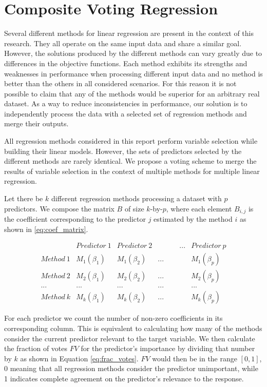 \chapter{Composite Voting Regression} \label{sec:comp_reg}
Several different methods for linear regression are present in the context of this research. They all operate on the same input data and share a similar goal. However, the solutions produced by the different methods can vary greatly due to differences in the objective functions. Each method exhibits its strengths and weaknesses in performance when processing different input data and no method is better than the others in all considered scenarios. For this reason it is not possible to claim that any of the methods would be superior for an arbitrary real dataset. As a way to reduce inconsistencies in performance, our solution is to independently process the data with a selected set of regression methods and merge their outputs. 

All regression methods considered in this report perform variable selection while building their linear models. However, the sets of predictors selected by the different methods are rarely identical. We propose a voting scheme to merge the results of variable selection in the context of multiple methods for multiple linear regression. 

Let there be $k$ different regression methods processing a dataset with $p$ predictors. We compose the matrix $B$ of size $k$-by-$p$, where each element $B_{i,j}$ is the coefficient corresponding to the predictor $j$ estimated by the method $i$ as shown in \ref{eq:coef_matrix}. 

{\def\arraystretch{1.5}\tabcolsep=10pt
\begin{equation} \label{eq:coef_matrix}
\begin{array}{l|rrrr} 
& Predictor\ 1 & Predictor\ 2 & \quad\quad\quad... & Predictor\ p \\
\hline	
Method\ 1 & M_1(\beta_1) & M_1(\beta_2) & ... & M_1(\beta_p) \\
Method\ 2 & M_2(\beta_1) & M_2(\beta_2) & ... & M_2(\beta_p) \\
... & ... & ... & ... & ... \\
Method\ k & M_k(\beta_1) & M_k(\beta_2) & ... & M_k(\beta_p)
\end{array}
\end{equation}
}

For each predictor we count the number of non-zero coefficients in its corresponding column. This is equivalent to calculating how many of the methods consider the current predictor relevant to the target variable. We then calculate the fraction of votes $FV$ for the predictor's importance by dividing that number by $k$ as shown in Equation \ref{eq:frac_votes}. $FV$ would then be in the range $[0,1]$, $0$ meaning that all regression methods consider the predictor unimportant, while 1 indicates complete agreement on the predictor's relevance to the response.

